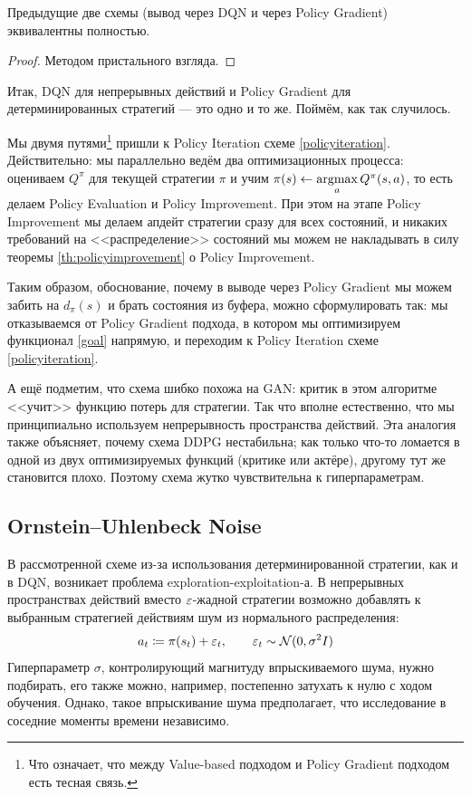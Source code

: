 \begin{theorem}
Предыдущие две схемы (вывод через DQN и через Policy Gradient) эквивалентны полностью.
\begin{proof}
Методом пристального взгляда.
\end{proof}
\end{theorem}

Итак, DQN для непрерывных действий и Policy Gradient для детерминированных стратегий --- это одно и то же. Поймём, как так случилось.

Мы двумя путями\footnote{Что означает, что между Value-based подходом и Policy Gradient подходом есть тесная связь.} пришли к Policy Iteration схеме \ref{policyiteration}. Действительно: мы параллельно ведём два оптимизационных процесса: оцениваем $Q^\pi$ для текущей стратегии $\pi$ и учим $\pi(s) \leftarrow \mathop{\mathrm{argmax}}\limits_a Q^\pi(s, a)$, то есть делаем Policy Evaluation и Policy Improvement. При этом на этапе Policy Improvement мы делаем апдейт стратегии сразу для всех состояний, и никаких требований на <<распределение>> состояний мы можем не накладывать в силу теоремы \ref{th:policyimprovement} о Policy Improvement. 

Таким образом, обоснование, почему в выводе через Policy Gradient мы можем забить на $d_\pi(s)$ и брать состояния из буфера, можно сформулировать так: мы отказываемся от Policy Gradient подхода, в котором мы оптимизируем функционал \eqref{goal} напрямую, и переходим к Policy Iteration схеме \ref{policyiteration}.

\begin{remark}
А ещё подметим, что схема шибко похожа на GAN: критик в этом алгоритме <<учит>> функцию потерь для стратегии. Так что вполне естественно, что мы принципиально используем непрерывность пространства действий. Эта аналогия также объясняет, почему схема DDPG нестабильна; как только что-то ломается в одной из двух оптимизируемых функций (критике или актёре), другому тут же становится плохо. Поэтому схема жутко чувствительна к гиперпараметрам.
\end{remark}

\subsection{Ornstein--Uhlenbeck Noise}

В рассмотренной схеме из-за использования детерминированной стратегии, как и в DQN, возникает проблема exploration-exploitation-а. В непрерывных пространствах действий вместо $\varepsilon$-жадной стратегии возможно добавлять к выбранным стратегией действиям шум из нормального распределения:
$$a_t \coloneqq \pi(s_t) + \varepsilon_t, \qquad \varepsilon_t \sim \mathcal{N}(0, \sigma^2I)$$
Гиперпараметр $\sigma$, контролирующий магнитуду впрыскиваемого шума, нужно подбирать, его также можно, например, постепенно затухать к нулю с ходом обучения. Однако, такое впрыскивание шума предполагает, что исследование в соседние моменты времени независимо.

